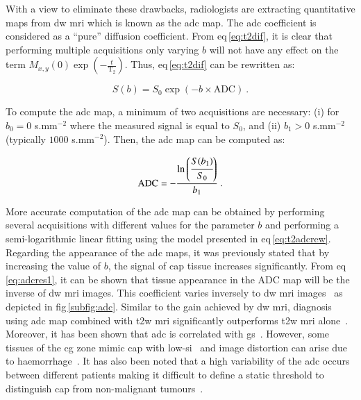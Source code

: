 With a view to eliminate these drawbacks, radiologists are extracting quantitative maps from \ac{dw} \ac{mri} which is known as the \ac{adc} map. The \ac{adc} coefficient is considered as a ``pure'' diffusion coefficient. From \acs{eq}\,\ref{eq:t2dif}, it is clear that performing multiple acquisitions only varying $b$ will not have any effect on the term $M_{x,y}(0) \exp \left( - \frac{t}{\text{T}_2} \right)$. Thus, \acs{eq}\,\ref{eq:t2dif} can be rewritten as:

\begin{equation}
  S(b) = S_0 \exp \left( -b \times \text{ADC} \right) \ .
  \label{eq:t2adcrew} 
\end{equation}
 
To compute the \ac{adc} map, a minimum of two acquisitions are necessary: (i) for $b_0=0$ s.mm$^{-2}$ where the measured signal is equal to $S_0$, and (ii) $b_1>0$ s.mm$^{-2}$ (typically $1000$ s.mm$^{-2}$). Then, the \ac{adc} map can be computed as:

\begin{equation}
  \text{ADC} = - \frac{\ln \left( \cfrac{S(b_1)}{S_0} \right) }{b_1} \ . 
  \label{eq:adcres1} 
\end{equation}

More accurate computation of the \ac{adc} map can be obtained by performing several acquisitions with different values for the parameter $b$ and performing a semi-logarithmic linear fitting using the model presented in \acs{eq}\,\eqref{eq:t2adcrew}. Regarding the appearance of the \ac{adc} maps, it was previously stated that by increasing the value of $b$, the signal of \ac{cap} tissue increases significantly. From \acs{eq}\,\eqref{eq:adcres1}, it can be shown that tissue appearance in the ADC map will be the inverse of \ac{dw} \ac{mri} images. This coefficient varies inversely to \ac{dw} \ac{mri} images~\cite{Barentsz2012} as depicted in \acs{fig}\,\ref{subfig:adc}. Similar to the gain achieved by \ac{dw} \ac{mri}, diagnosis using \ac{adc} map combined with \ac{t2w} \ac{mri} significantly outperforms \ac{t2w} \ac{mri} alone~\cite{Doo2012,Choi2007}. Moreover, it has been shown that \ac{adc} is correlated with \ac{gs}~\cite{Hambrock2011, Itou2011, Peng2013}. However, some tissues of the \ac{cg} zone mimic \ac{cap} with low-\ac{si}~\cite{Kirkham2006} and image distortion can arise due to haemorrhage~\cite{Choi2007}. It has also been noted that a high variability of the \ac{adc} occurs between different patients making it difficult to define a static threshold to distinguish \ac{cap} from non-malignant tumours~\cite{Choi2007}.

